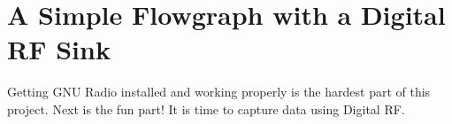 \chapter{A Simple Flowgraph with a Digital RF Sink}

Getting GNU Radio installed and working properly is the hardest part of this project.
Next is the fun part!  It is time to capture data using Digital RF.

